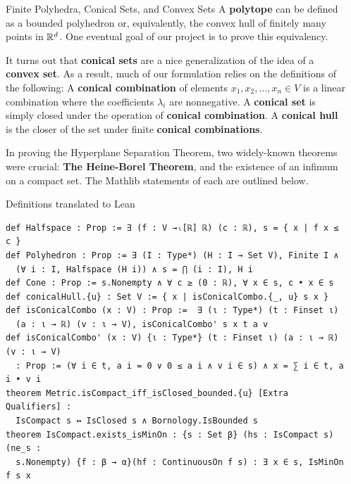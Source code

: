 \documentclass[final]{beamer}
\newlength{\sepwidth}
\newlength{\colwidth}
\newcommand{\separatorcolumn}{\begin{column}{\sepwidth}\end{column}}
\begin{document}
\begin{frame}[fragile]
\begin{columns}[t]
\begin{column}{\colwidth}
\begin{block}{Finite Polyhedra, Conical Sets, and Convex Sets}
                A \textbf{polytope} can be defined as a bounded polyhedron or, equivalently, the convex hull of finitely many points in $\mathbb{R}^d$. One eventual goal of our project is to prove this equivalency. 
                
                It turns out that \textbf{conical sets} are a nice generalization of the idea of a \textbf{convex set}. As a result, much of our formulation relies on the definitions of the following: A \textbf{conical combination} of elements $x_1,x_2,\dots,x_n \in V$ is a linear combination where the coefficients $\lambda_i$ are nonnegative. A \textbf{conical set} is simply closed under the operation of \textbf{conical combination}. A \textbf{conical hull} is the closer of the set under finite \textbf{conical combinations}.
                
                In proving the Hyperplane Separation Theorem, two widely-known theorems were crucial: \textbf{The Heine-Borel Theorem}, and the existence of an infimum on a compact set. The Mathlib statements of each are outlined below. 
            \end{block}

            \begin{block}{Definitions translated to Lean}
            \vspace{-0.5em}
\begin{Verbatim}
def Halfspace : Prop := ∃ (f : V →ₗ[ℝ] ℝ) (c : ℝ), s = { x | f x ≤ c }
def Polyhedron : Prop := ∃ (I : Type*) (H : I → Set V), Finite I ∧ 
  (∀ i : I, Halfspace (H i)) ∧ s = ⋂ (i : I), H i
def Cone : Prop := s.Nonempty ∧ ∀ c ≥ (0 : ℝ), ∀ x ∈ s, c • x ∈ s
def conicalHull.{u} : Set V := { x | isConicalCombo.{_, u} s x }
def isConicalCombo (x : V) : Prop :=  ∃ (ι : Type*) (t : Finset ι) 
  (a : ι → ℝ) (v : ι → V), isConicalCombo' s x t a v
def isConicalCombo' (x : V) {ι : Type*} (t : Finset ι) (a : ι → ℝ) (v : ι → V)
  : Prop := (∀ i ∈ t, a i = 0 ∨ 0 ≤ a i ∧ v i ∈ s) ∧ x = ∑ i ∈ t, a i • v i
theorem Metric.isCompact_iff_isClosed_bounded.{u} [Extra Qualifiers] :
  IsCompact s ↔ IsClosed s ∧ Bornology.IsBounded s
theorem IsCompact.exists_isMinOn : {s : Set β} (hs : IsCompact s) (ne_s :
  s.Nonempty) {f : β → α}(hf : ContinuousOn f s) : ∃ x ∈ s, IsMinOn f s x
\end{Verbatim}
        \end{block}
           
            
        \end{column}

        \separatorcolumn


\end{columns}
\end{frame}
\end{document}
